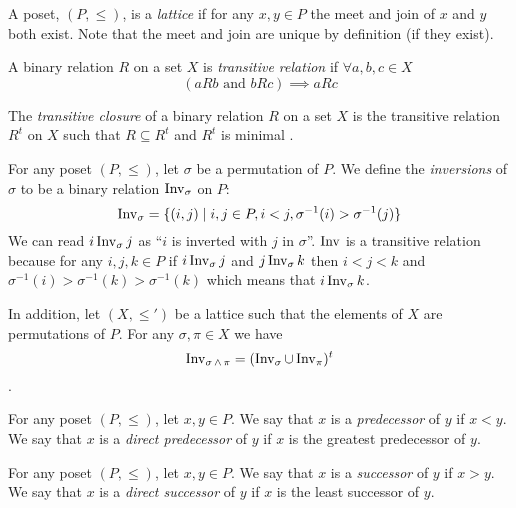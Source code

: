 	\begin{definition}
		A poset, $(P, \le)$, is a \emph{lattice} if for any $x, y \in P$ the meet and join of $x$ and $y$ both exist. Note that the meet and join are unique by definition (if they exist).
	\end{definition}

	\begin{definition}
		A binary relation $R$ on a set $X$ is \emph{transitive relation} if $\forall a,b,c \in X$
		\[
			(aRb \textrm{ and } bRc) \implies aRc
		\]
	\end{definition}

	\begin{definition}
		The \emph{transitive closure} of a binary relation $R$ on a set $X$ is the transitive relation $R^t$ on $X$ such that $R \subseteq R^t$ and $R^t$ is minimal \cite[p. 337]{lidl1998applied}.
	\end{definition}

	\begin{definition}
		For any poset $(P, \le)$, let $\sigma$ be a permutation of $P$. We define the \emph{inversions} of $\sigma$ to be a binary relation $\operatorname{Inv}_{\sigma}$ on $P$:
		\[
			\operatorname{Inv}_{\sigma} = \{(i,j) \mid i, j \in P, i < j, \sigma^{-1}(i) > \sigma^{-1}(j)\}
		\]
		We can read $i \operatorname{Inv}_{\sigma} j$ as ``$i$ is inverted with $j$ in $\sigma$''. $\operatorname{Inv}$ is a transitive relation because for any $i,j,k \in P$ if $i \operatorname{Inv}_{\sigma} j$ and $j \operatorname{Inv}_{\sigma} k$ then $i < j < k$ and $\sigma^{-1}(i) > \sigma^{-1}(k) > \sigma^{-1}(k)$ which means that $i \operatorname{Inv}_{\sigma} k$.

		In addition, let $(X, \le')$ be a lattice such that the elements of $X$ are permutations of $P$. For any $\sigma, \pi \in X$ we have
		\[
			\operatorname{Inv}_{\sigma \operatorname{\wedge} \pi} = (\operatorname{Inv}_{\sigma} \cup \operatorname{Inv}_{\pi})^t
		\]
		\cite{markowsky1994permutation}.
	\end{definition}

	\begin{definition}
		For any poset $(P, \le)$, let $x,y \in P$. We say that $x$ is a \emph{predecessor} of $y$ if $x < y$. We say that $x$ is a \emph{direct predecessor} of $y$ if $x$ is the greatest predecessor of $y$.
	\end{definition}

	\begin{definition}
		For any poset $(P, \le)$, let $x,y \in P$. We say that $x$ is a \emph{successor} of $y$ if $x > y$. We say that $x$ is a \emph{direct successor} of $y$ if $x$ is the least successor of $y$.
	\end{definition}

